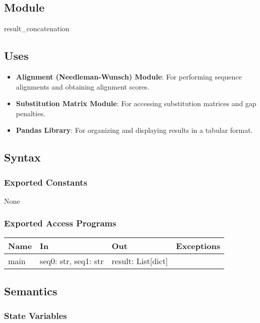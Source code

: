 \documentclass[12pt, titlepage]{article}
\begin{document}
\subsection{Module}

result\_concatenation

\subsection{Uses}

\begin{itemize}
    \item \textbf{Alignment (Needleman-Wunsch) Module}: For performing sequence alignments and obtaining alignment scores.
    \item \textbf{Substitution Matrix Module}: For accessing substitution matrices and gap penalties.
    \item \textbf{Pandas Library}: For organizing and displaying results in a tabular format.
\end{itemize}

\subsection{Syntax}

\subsubsection{Exported Constants}

None

\subsubsection{Exported Access Programs}

\begin{center}
\begin{tabular}{p{4cm} p{4cm} p{3cm} p{2cm}}
\hline
\textbf{Name} & \textbf{In} & \textbf{Out} & \textbf{Exceptions} \\
\hline
main & seq0: str, seq1: str & result: List[dict] &  \\
\hline
\end{tabular}
\end{center}

\subsection{Semantics}

\subsubsection{State Variables}
\end{document}
